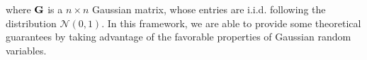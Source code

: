 \documentclass[12pt,draftcls,onecolumn]{IEEEtran}
\begin{document}
where $\mathbf{G}$ is a $n\times n$ Gaussian matrix, whose entries are i.i.d. following the distribution $\mathcal{N}\left(0,1\right)$. In this framework, we are able to provide some theoretical guarantees by taking advantage of the favorable properties of Gaussian random variables.

\end{document}
